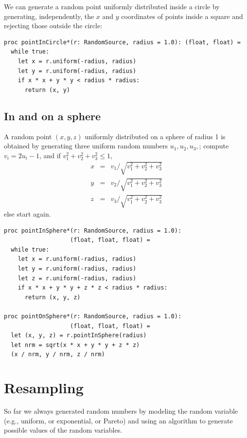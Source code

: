\documentclass[justified, sixbynine]{tufte-book}
\def\ft{\small\tt}
\theoremstyle{plain}%
\newtheorem * {corollary}{Corollary}
\theoremstyle{definition}
\theoremstyle{remark}
\newtheorem * {remark}{Remark}
\newtheorem * {note}{Note}
\begin{document}
\begin{fullwidth}
We can generate a random point uniformly distributed inside a circle by generating, independently, the $x$ and $y$ coordinates of points inside a square and rejecting those outside the circle:

\begin{lstlisting}[caption={in file: {\ft nlib/randomgen.nim}}]
proc pointInCircle*(r: RandomSource, radius = 1.0): (float, float) =
  while true:
    let x = r.uniform(-radius, radius)
    let y = r.uniform(-radius, radius)
    if x * x + y * y < radius * radius:
      return (x, y)
\end{lstlisting}

\goodbreak\subsection{In and on a sphere}

A random point $(x, y, z)$ uniformly distributed on a sphere of radius 1 is
obtained by generating three uniform random numbers $u_1, u_2, u_3, $; compute $%
v_i=2u_i-1$, and if $v_1^2+v_2^2+v_3^2\leq 1$,
\begin{eqnarray}
x &=&v_1/\sqrt{v_1^2+v_2^2+v_3^2} \\
y &=&v_2/\sqrt{v_1^2+v_2^2+v_3^2} \\
z &=&v_3/\sqrt{v_1^2+v_2^2+v_3^2}
\end{eqnarray}
else start again.

\begin{lstlisting}[caption={in file: {\ft nlib/randomgen.nim}}]
proc pointInSphere*(r: RandomSource, radius = 1.0):
                   (float, float, float) =
  while true:
    let x = r.uniform(-radius, radius)
    let y = r.uniform(-radius, radius)
    let z = r.uniform(-radius, radius)
    if x * x + y * y + z * z < radius * radius:
      return (x, y, z)

proc pointOnSphere*(r: RandomSource, radius = 1.0):
                   (float, float, float) =
  let (x, y, z) = r.pointInSphere(radius)
  let nrm = sqrt(x * x + y * y + z * z)
  (x / nrm, y / nrm, z / nrm)
\end{lstlisting}

\section{Resampling}

So far we always generated random numbers by modeling the random variable (e.g., uniform, or exponential, or Pareto) and using an algorithm to generate possible values of the random variables.


\end{fullwidth}
\end{document}
